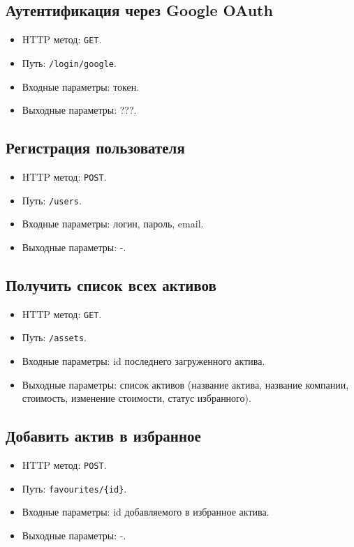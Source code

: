 \documentclass[a4paper, 14pt]{article}
\begin{document}
\subsection{Аутентификация через Google OAuth}

\begin{itemize}
    \item HTTP метод: \texttt{GET}.
    \item Путь: \texttt{/login/google}.
    \item Входные параметры: токен.
    \item Выходные параметры: ???.
\end{itemize}

\subsection{Регистрация пользователя}

\begin{itemize}
    \item HTTP метод: \texttt{POST}.
    \item Путь: \texttt{/users}.
    \item Входные параметры: логин, пароль, email.
    \item Выходные параметры: -.
\end{itemize}

\subsection{Получить список всех активов}

\begin{itemize}
    \item HTTP метод: \texttt{GET}.
    \item Путь: \texttt{/assets}.
    \item Входные параметры: id последнего загруженного актива.
    \item Выходные параметры: список активов (название актива, название компании, стоимость, изменение стоимости, статус избранного).
\end{itemize}

\subsection{Добавить актив в избранное}

\begin{itemize}
    \item HTTP метод: \texttt{POST}.
    \item Путь: \texttt{favourites/\{id\}}.
    \item Входные параметры: id добавляемого в избранное актива.
    \item Выходные параметры: -.
\end{itemize}
\end{document}
